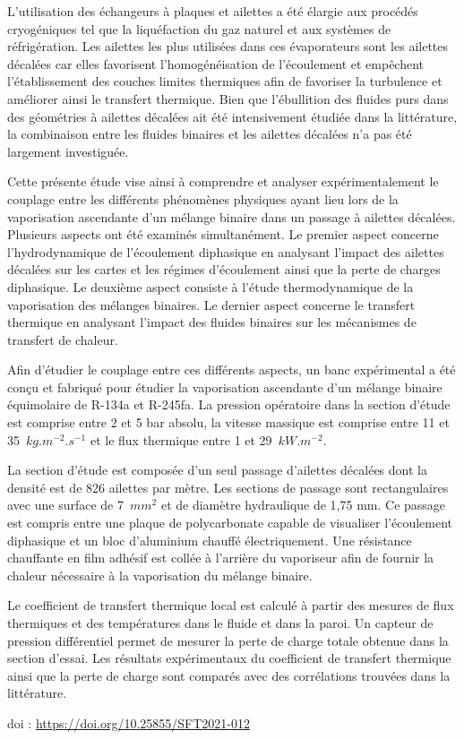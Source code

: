 {\normalsize
L'utilisation des échangeurs à plaques et ailettes a été élargie aux procédés cryogéniques tel que la liquéfaction du gaz naturel et aux systèmes de réfrigération. Les ailettes les plus utilisées dans ces évaporateurs sont les ailettes décalées car elles favorisent l'homogénéisation de l'écoulement et empêchent l'établissement des couches limites thermiques afin de favoriser la turbulence et améliorer ainsi le transfert thermique. Bien que l'ébullition des fluides purs dans des géométries à ailettes décalées ait été intensivement étudiée dans la littérature, la combinaison entre les fluides binaires et les ailettes décalées n'a pas été largement investiguée. 



Cette présente étude vise ainsi à comprendre et analyser expérimentalement le couplage entre les différents phénomènes physiques ayant lieu lors de la vaporisation ascendante d'un mélange binaire dans un passage à ailettes décalées. Plusieurs aspects ont été examinés simultanément. Le premier aspect concerne l'hydrodynamique de l'écoulement diphasique en analysant l'impact des ailettes décalées sur les cartes et les régimes d'écoulement ainsi que la perte de charges diphasique. Le deuxième aspect consiste à l'étude thermodynamique de la vaporisation des mélanges binaires. Le dernier aspect concerne le transfert thermique en analysant l'impact des fluides binaires sur les mécanismes de transfert de chaleur.     



Afin d'étudier le couplage entre ces différents aspects, un banc expérimental a été conçu et fabriqué pour étudier la vaporisation ascendante d'un mélange binaire équimolaire de R-134a et R-245fa. La pression opératoire dans la section d'étude est comprise entre 2 et 5 bar absolu, la vitesse massique est comprise entre 11 et 35~$\unit{kg.m^{-2}.s^{-1}}$ et le flux thermique entre 1 et 29~$\unit{kW.m^{-2}}$.



La section d'étude est composée d'un seul passage d'ailettes décalées dont la densité est de 826 ailettes par mètre. Les sections de passage sont rectangulaires avec une surface de 7~$\unit{mm^2}$ et de diamètre hydraulique de 1,75 mm. Ce passage est compris entre une plaque de polycarbonate capable de visualiser l'écoulement diphasique et un bloc d'aluminium chauffé électriquement. Une résistance chauffante en film adhésif est collée à l'arrière du vaporiseur afin de fournir la chaleur nécessaire à la vaporisation du mélange binaire. 



Le coefficient de transfert thermique local est calculé à partir des mesures de flux thermiques et des températures dans le fluide et dans la paroi. Un capteur de pression différentiel permet de mesurer la perte de charge totale obtenue dans la section d'essai. Les résultats expérimentaux du coefficient de transfert thermique ainsi que la perte de charge sont comparés avec des corrélations trouvées dans la littérature.

 \vfill doi : \url{https://doi.org/10.25855/SFT2021-012}

}
 
